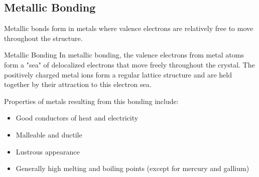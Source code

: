 
\subsection{Metallic Bonding}

Metallic bonds form in metals where valence electrons are relatively free to move throughout the structure.

\begin{keyconcept}{Metallic Bonding}
In metallic bonding, the valence electrons from metal atoms form a "sea" of delocalized electrons that move freely throughout the crystal. The positively charged metal ions form a regular lattice structure and are held together by their attraction to this electron sea.
\end{keyconcept}

Properties of metals resulting from this bonding include:
\begin{itemize}
    \item Good conductors of heat and electricity
    \item Malleable and ductile
    \item Lustrous appearance
    \item Generally high melting and boiling points (except for mercury and gallium)
\end{itemize}


